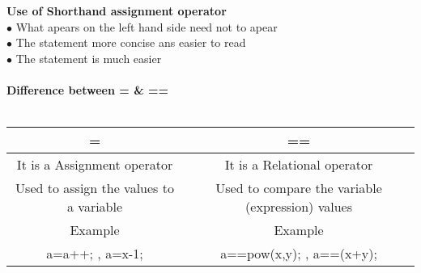 \documentclass{article}
\begin{document}
	\\ \\
	\textbf{Use of Shorthand assignment operator} \\
	$\bullet$ What apears on the left hand side need not to apear \\
	$\bullet$ The statement more concise ans easier to read \\
	$\bullet$ The statement is much easier
	\\ \\
	\textbf{Difference between = \& ==}
	\\ \\
	\begin{tabular}{|c|c|}
		\hline
		= & == \\
		\hline
		It is a Assignment operator $\quad \quad \quad \quad ~$ & It is a Relational operator $\quad \quad \quad \quad \quad \quad \quad \quad \quad ~ ~$\\
		Used to assign the values to a variable & Used to compare the variable (expression) values \\
		Example $\quad \quad \quad \quad \quad \quad \quad \quad \quad \quad \quad \quad ~~ $ & Example $$\quad \quad \quad \quad \quad \quad \quad \quad \quad \quad \quad \quad \quad \quad \quad \quad ~~~ $$ \\
		a=a++; , a=x-1; $ \quad \quad \quad \quad \quad \quad \quad \quad \quad $ & a==pow(x,y); , a==(x+y); $ \quad \quad \quad \quad \quad \quad \quad \quad \quad $ \\
		\hline
	\end{tabular}
	
	
\end{document}

